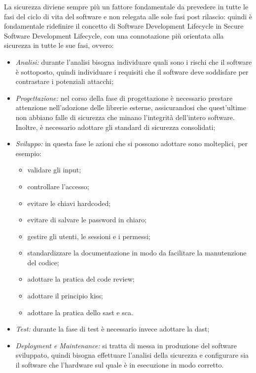 La sicurezza diviene sempre più un fattore fondamentale da prevedere in tutte le fasi del ciclo di vita del software e non relegata alle sole fasi post rilascio: quindi è fondamentale ridefinire il concetto di Software Development Lifecycle in Secure Software Development Lifecycle\cite{site:ssdl}, con una connotazione più orientata alla sicurezza in tutte le sue fasi, ovvero:
\begin{itemize}
    \item \textit{Analisi:} durante l'analisi bisogna individuare quali sono i rischi che il software è sottoposto, quindi individuare i requisiti che il software deve soddisfare per contrastare i potenziali attacchi;
    \item \textit{Progettazione:} nel corso della fase di progettazione è necessario prestare attenzione nell'adozione delle librerie esterne, assicurandosi che quest'ultime non abbiano falle di sicurezza che minano l'integrità dell'intero software.
    Inoltre, è necessario adottare gli standard di sicurezza consolidati;
    \item \textit{Sviluppo:} in questa fase le azioni\cite{site:security-best-practice} che si possono adottare sono molteplici, per esempio:
    \begin{itemize}
        \item validare gli input;
        \item controllare l'accesso;
        \item evitare le chiavi hardcoded;
        \item evitare di salvare le password in chiaro;
        \item gestire gli utenti, le sessioni e i permessi;
        \item standardizzare la documentazione in modo da facilitare la manutenzione del codice;
        \item adottare la pratica del code review;
        \item adottare il principio \gls{kiss};
        \item adottare la pratica dello \gls{sast} e \gls{sca}.
    \end{itemize}
    \item \textit{Test:} durante la fase di test è necessario invece adottare la \gls{dast};
    \item \textit{Deployment e Maintenance:} si tratta di messa in produzione del software sviluppato, quindi bisogna effettuare l'analisi della sicurezza e configurare sia il software che l'hardware sul quale è in esecuzione in modo corretto.
\end{itemize}

